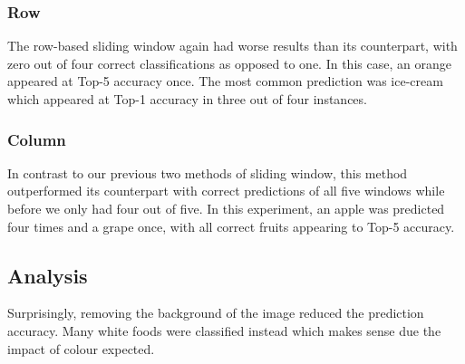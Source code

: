 \tocless\subsubsection{Row}
The row-based sliding window again had worse results than its counterpart, with
zero out of four correct classifications as opposed to one. In this case, an
orange appeared at Top-5 accuracy once. The most common prediction was ice-cream
which appeared at Top-1 accuracy in three out of four instances.

\tocless\subsubsection{Column}
In contrast to our previous two methods of sliding window, this method
outperformed its counterpart with correct predictions of all five windows while
before we only had four out of five. In this experiment, an apple was predicted
four times and a grape once, with all correct fruits appearing to Top-5
accuracy.

\tocless\subsection{Analysis}
Surprisingly, removing the background of the image reduced the prediction
accuracy.
Many white foods were classified instead which makes sense due
the impact of colour expected.
